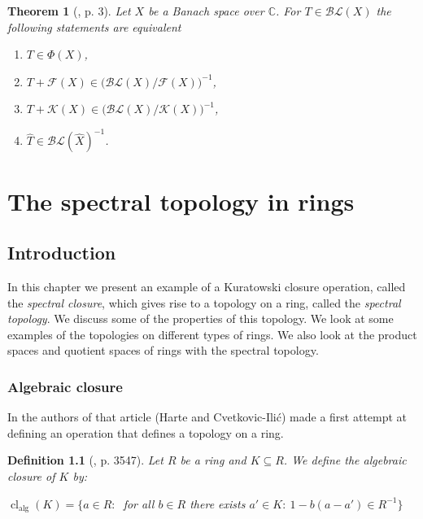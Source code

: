 \documentclass[12pt, oneside]{book}
\newtheorem{theorem}{Theorem}[subsection]
\newtheorem{definition}[theorem]{Definition}
\def\cl{\operatorname{cl}}
\def\alg{\operatorname{alg}}
\begin{document}
\begin{theorem} [\cite{BMSW}, p. 3]
\normalfont Let $X$ be a Banach space over $\mathbb{C}$. For $T \in \mathcal{BL}(X)$ the 
following statements are equivalent
\begin{enumerate}[label=(\alph*)]
\item $T \in \Phi(X)$,
\item $T + \mathcal{F}(X) \in \big(\mathcal{BL}(X)/\mathcal{F}(X)\big)^{-1}$,
\item $T + \mathcal{K}(X) \in \big(\mathcal{BL}(X)/\mathcal{K}(X)\big)^{-1}$,
\item $\hat{T} \in \mathcal{BL}(\hat{X})^{-1}$.
\end{enumerate}
\end{theorem}
\vskip 2cm
\begin{center}
\maltese
\end{center}
\chapter{The spectral topology in rings}

\section{Introduction}

In this chapter we present an example of a Kuratowski closure operation, called the 
{\sl spectral closure}, which gives rise to a topology on a ring, called the 
{\sl spectral topology}. We discuss some of the properties of this topology. We look at some 
examples of the topologies on different types of rings. We also look at the product spaces and 
quotient spaces of rings with the spectral topology. 


\subsection{Algebraic closure}
In \cite{CH2} the authors of that article (Harte and Cvetkovic-Ili\'{c}) made a first attempt at defining an operation that  defines a topology on a ring.
\begin{definition}[\cite{CH2}, p. 3547] 
\normalfont
Let $R$ be a ring and $K \subseteq R$. We define the {\sl algebraic closure} of $K$ by:
\begin{center}
$\cl_{\alg}(K) = \{ a \in R:\ $ for all $b \in R$ there exists $a' \in K:\  1-b(a-a') \in R^{-1}\}$
\end{center}
\end{definition}
\end{document}
